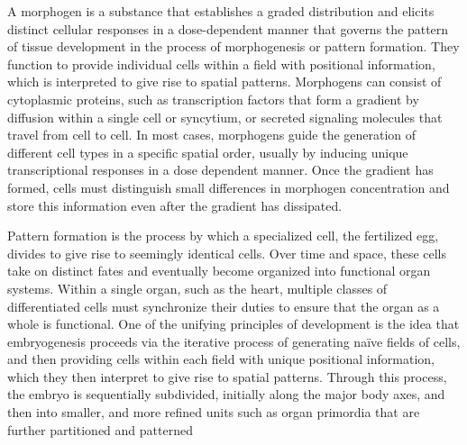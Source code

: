 \documentclass{article}
\begin{document}
A morphogen is a substance that establishes a graded distribution and elicits distinct cellular responses in a dose-dependent manner that governs the pattern of tissue development in the process of morphogenesis or pattern formation. 
They function to provide individual cells within a field with positional information, which is interpreted to give rise to spatial patterns.
Morphogens can consist of cytoplasmic proteins, such as transcription factors that form a gradient by diffusion within a single cell or syncytium, or secreted signaling molecules that travel from cell to cell. 
In most cases, morphogens guide the generation of different cell types in a specific spatial order, usually by inducing unique transcriptional responses in a dose dependent manner.
Once the gradient has formed, cells must distinguish small differences in morphogen concentration and store this information even after the gradient has dissipated.

Pattern formation is the process by which a specialized cell, the fertilized egg, divides to give rise to seemingly identical cells. 
Over time and space, these cells take on distinct fates and eventually become organized into functional organ systems. 
Within a single organ, such as the heart, multiple classes of differentiated cells must synchronize their duties to ensure that the organ as a whole is functional. 
One of the unifying principles of development is the idea that embryogenesis proceeds via the iterative process of generating naïve fields of cells, and then providing cells within each field with unique positional information, which they then interpret to give rise to spatial patterns. 
Through this process, the embryo is sequentially subdivided, initially along the major body axes, and then into smaller, and more refined units such as organ primordia that are further partitioned and patterned	
\end{document}
